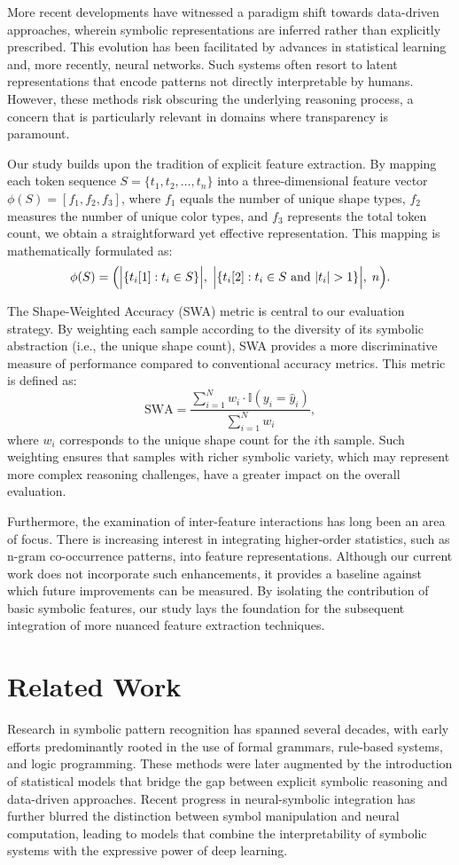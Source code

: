 \documentclass{article}
\begin{document}
More recent developments have witnessed a paradigm shift towards data-driven approaches, wherein symbolic representations are inferred rather than explicitly prescribed. This evolution has been facilitated by advances in statistical learning and, more recently, neural networks. Such systems often resort to latent representations that encode patterns not directly interpretable by humans. However, these methods risk obscuring the underlying reasoning process, a concern that is particularly relevant in domains where transparency is paramount.

Our study builds upon the tradition of explicit feature extraction. By mapping each token sequence \(S = \{t_1, t_2, \ldots, t_n\}\) into a three-dimensional feature vector \(\phi(S) = [f_1, f_2, f_3]\), where \(f_1\) equals the number of unique shape types, \(f_2\) measures the number of unique color types, and \(f_3\) represents the total token count, we obtain a straightforward yet effective representation. This mapping is mathematically formulated as:
\[
\phi(S) = \Bigl( \Bigl|\{t_i[1] : t_i \in S\}\Bigr|, \; \Bigl|\{t_i[2] : t_i \in S \text{ and } |t_i| > 1\}\Bigr|, \; n \Bigr).
\]

The Shape-Weighted Accuracy (SWA) metric is central to our evaluation strategy. By weighting each sample according to the diversity of its symbolic abstraction (i.e., the unique shape count), SWA provides a more discriminative measure of performance compared to conventional accuracy metrics. This metric is defined as:
\[
\mathrm{SWA} = \frac{\sum_{i=1}^N w_i \cdot \mathbb{I}(y_i = \hat{y}_i)}{\sum_{i=1}^N w_i},
\]
where \(w_i\) corresponds to the unique shape count for the \(i\)th sample. Such weighting ensures that samples with richer symbolic variety, which may represent more complex reasoning challenges, have a greater impact on the overall evaluation.

Furthermore, the examination of inter-feature interactions has long been an area of focus. There is increasing interest in integrating higher-order statistics, such as n-gram co-occurrence patterns, into feature representations. Although our current work does not incorporate such enhancements, it provides a baseline against which future improvements can be measured. By isolating the contribution of basic symbolic features, our study lays the foundation for the subsequent integration of more nuanced feature extraction techniques.

\section{Related Work}
Research in symbolic pattern recognition has spanned several decades, with early efforts predominantly rooted in the use of formal grammars, rule-based systems, and logic programming. These methods were later augmented by the introduction of statistical models that bridge the gap between explicit symbolic reasoning and data-driven approaches. Recent progress in neural-symbolic integration has further blurred the distinction between symbol manipulation and neural computation, leading to models that combine the interpretability of symbolic systems with the expressive power of deep learning.
\end{document}
